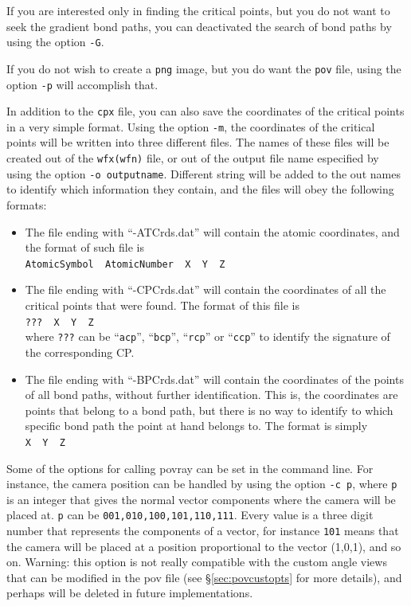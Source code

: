 If you are interested only in finding the critical points, but you do not want to seek the gradient bond paths, you can deactivated the search of bond paths by using the option \texttt{-G}.

If you do not wish to create a \texttt{png} image, but you do want the \texttt{pov} file, using the option \texttt{-p} will accomplish that.

In addition to the \texttt{cpx} file, you can also save the coordinates of the critical points in a very simple format. Using the option \texttt{-m}, the coordinates of the critical points will be written into three different files. The names of these files will be created out of the \texttt{wfx(wfn)} file, or out of the output file name especified by using the option \texttt{-o outputname}. Different string will be added to the out names to identify which information they contain, and the files will obey the following formats:
\begin{itemize}
   \item The file ending with ``-ATCrds.dat'' will contain the atomic coordinates, and the format of such file is\\
   \texttt{AtomicSymbol \ AtomicNumber \ X \ Y \ Z}
   \item The file ending with ``-CPCrds.dat'' will contain the coordinates of all the critical points that were found. The format of this file is\\
   \texttt{??? \ X \ Y \ Z}\\
   where \texttt{???} can be ``\texttt{acp}'', ``\texttt{bcp}'', ``\texttt{rcp}'' or ``\texttt{ccp}'' to identify the signature of the corresponding CP.
   \item The file ending with ``-BPCrds.dat'' will contain the coordinates of the points of all bond paths, without further identification. This is, the coordinates are points that belong to a bond path, but there is no way to identify to which specific bond path the point at hand belongs to. The format is simply\\
   \texttt{X \ Y \ Z}
\end{itemize}

Some of the options for calling povray can be set in the command line. For instance, the camera position can be handled by using the option \texttt{-c p}, where \texttt{p} is an integer that gives the normal vector components where the camera will be placed at. \texttt{p} can be \texttt{001,010,100,101,110,111}. Every value is a three digit number that represents the components of a vector, for instance \texttt{101} means that the camera will be placed at a position proportional to the vector (1,0,1), and so on. Warning: this option is not really compatible with the custom angle views that can be modified in the pov file (see \S\ref{sec:povcustopts} for more details), and perhaps will be deleted in future implementations.


